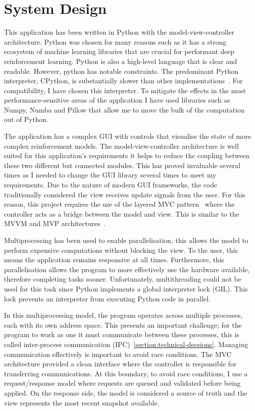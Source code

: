 \documentclass[]{final_report}
\begin{document}
\section{System Design}


This application has been written in Python with the model-view-controller architecture. Python was chosen for many reasons such as it has a strong ecosystem of machine learning libraries that are crucial for performant deep reinforcement learning. Python is also a high-level language that is clear and readable. However, python has notable constraints.  The predominant Python interpreter, CPython, is substantially slower than other implementations~\cite{pythonMachineLearning}. For compatibility, I have chosen this interpreter. To mitigate the effects in the most performance-sensitive areas of the application I have used libraries such as Numpy, Numba and Pillow that allow me to move the bulk of the computation out of Python.  

The application has a complex GUI with controls that visualise the state of more complex reinforcement models. The model-view-controller architecture is well suited for this application's requirements it helps to reduce the coupling between these two different but connected modules. This has proved invaluable several times as I needed to change the GUI library several times to meet my requirements. Due to the nature of modern GUI frameworks, the code traditionally considered the view receives update signals from the user. For this reason, this project requires the use of the layered MVC pattern~\cite{webMVC,gamesMVC} where the controller acts as a bridge between the model and view. This is similar to the MVVM and MVP architectures~\cite{mvvm}.

Multiprocessing has been used to enable parallelisation, this allows the model to perform expensive computations without blocking the view. To the user, this means the application remains responsive at all times. Furthermore, this parallelisation allows the program to more effectively use the hardware available, therefore completing tasks sooner. Unfortunately, multithreading could not be used for this task since Python implements a global interpreter lock (GIL). This lock prevents an interpreter from executing Python code in parallel. 

In this multiprocessing model, the program operates across multiple processes, each with its own address space. This presents an important challenge; for the program to work as one it must communicate between these processes, this is called inter-process communication (IPC)~\ref{section:technical-decsions}. Managing communication effectively is important to avoid race conditions. The MVC architecture provided a clean interface where the controller is responsible for transferring communications. At this boundary, to avoid race conditions, I use a request/response model where requests are queued and validated before being applied. On the response side, the model is considered a source of truth and the view represents the most recent snapshot available.  
\end{document}
